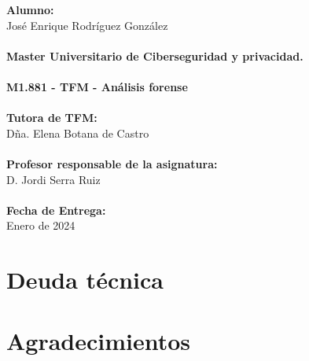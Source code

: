 \documentclass[12pt,a4paper]{report}
\begin{document}
\begin{titlepage}
\begin{minipage}{0.5\textwidth}
    \end{minipage}
    \begin{minipage}{0.5\textwidth}
        \textbf{Alumno:} \\
        {José Enrique Rodríguez González} \\
        \\
        \textbf{Master Universitario de Ciberseguridad y privacidad.} \\
        \\
        \textbf{M1.881 - TFM - Análisis forense} \\
        \\
        \textbf{Tutora de TFM:} \\
        {Dña. Elena Botana de Castro} \\
        \\
        \textbf{Profesor responsable de la asignatura:} \\
        {D. Jordi Serra Ruiz} \\
        \\
        \textbf{Fecha de Entrega:} \\
        {Enero de 2024}
    \end{minipage}
    
    \vfill %
    
    
\end{titlepage}
\restoregeometry 


\newpage  %


\chapter*{Deuda técnica}  %

\clearpage


\chapter*{Agradecimientos}  %

\clearpage

\tableofcontents %
\end{document}
